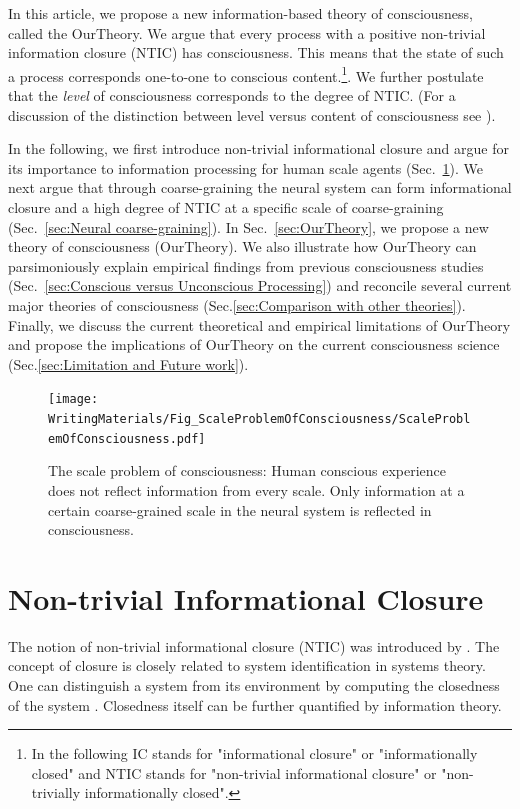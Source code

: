 \documentclass[utf8]{article}
\begin{document}
		In this article, we propose a new information-based theory of consciousness, called the  \acf{OurTheory}. We argue that every process with a positive non-trivial information closure (NTIC) has consciousness. This means that the state of such a process corresponds one-to-one to conscious content.\footnote{In the following IC stands for "informational closure" or "informationally closed" and NTIC stands for "non-trivial informational closure" or "non-trivially informationally closed".}. We further postulate that the \textit{level} of consciousness corresponds to the degree of NTIC. (For a discussion of the distinction between level versus content of consciousness see \cite{laureys2005neural, overgaard2010neural}).
		
		In the following, we first introduce non-trivial informational closure and argue for its importance to information processing for human scale agents (Sec.~\ref{sec:Non-trivial informational closure}). We next argue that through coarse-graining the neural system can form informational closure and a high degree of NTIC at a specific scale of coarse-graining  (Sec.~\ref{sec:Neural coarse-graining}). In Sec.~\ref{sec:OurTheory}, we propose a new theory of consciousness (\ac{OurTheory}). We also illustrate how \ac{OurTheory} can parsimoniously explain empirical findings from previous consciousness studies (Sec.~\ref{sec:Conscious versus Unconscious Processing}) and reconcile several current major theories of consciousness (Sec.\ref{sec:Comparison with other theories}). Finally, we discuss the current theoretical and empirical limitations of \ac{OurTheory} and propose the implications of \ac{OurTheory} on the current consciousness science (Sec.\ref{sec:Limitation and Future work}). 


		\begin{figure}[H]
		    \centering
			\texttt{[image: WritingMaterials/Fig\_ScaleProblemOfConsciousness/ScaleProblemOfConsciousness.pdf]}
			\caption{The scale problem of consciousness: Human conscious experience does not reflect information from every scale. Only information at a certain coarse-grained scale in the neural system is reflected in consciousness.}
			\label{fig:scaleproblem}
	   	\end{figure}


	\section{Non-trivial Informational Closure} \label{sec:Non-trivial informational closure}
		The notion of non-trivial informational closure (NTIC) was introduced by \cite{BERTSCHINGER.2006}. The concept of closure is closely related to system identification in systems theory. One can distinguish a system from its environment by computing the closedness of the system \citep{maturana1991autopoiesis, rosen1991life, pattee2012evolving, luhmann1995probleme}. Closedness itself can be further quantified by information theory.
\end{document}
